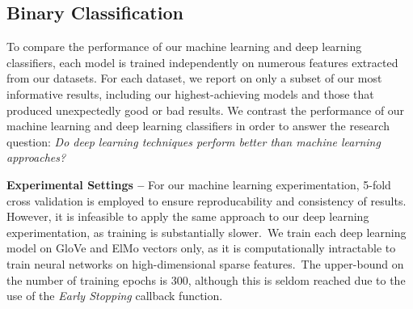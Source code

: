 \documentclass[12pt,a4paper]{article}
\begin{document}



\subsection{Binary Classification}\vspace{-5pt}
\noindent To compare the performance of our machine learning and deep learning classifiers, each model is trained independently on numerous features extracted from our datasets. For each dataset, we report on only a subset of our most informative results, including our highest-achieving models and those that produced unexpectedly good or bad results. We contrast the performance of our machine learning and deep learning classifiers in order to answer the research question: \textit{Do deep learning techniques perform better than machine learning approaches?}\\\vspace{-5pt}



\noindent \textbf{Experimental Settings --} For our machine learning experimentation, 5-fold cross validation is employed to ensure reproducability and consistency of results. However, it is infeasible to apply the same approach to our deep learning experimentation, as training is substantially slower.\ We train each deep learning model on GloVe and ElMo vectors only, as it is computationally intractable to train neural networks on high-dimensional sparse features.\ The upper-bound on the number of training epochs is 300, although this is seldom reached due to the use of the \textit{Early Stopping} callback function. \vspace{-4pt}
\end{document}
